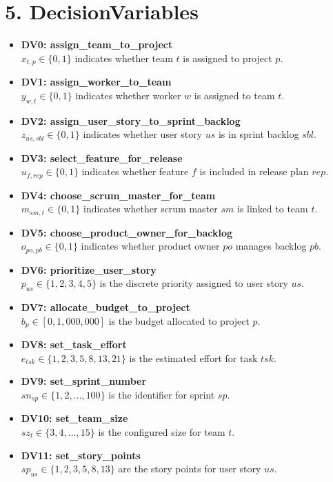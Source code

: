 \documentclass[11pt,a4paper]{article}
\begin{document}
\section{5. DecisionVariables}
\begin{itemize}[leftmargin=2em]
  \item \textbf{DV0: assign\_team\_to\_project} \\
  $x_{t,p}\in\{0,1\}$ indicates whether team $t$ is assigned to project $p$.
  
  \item \textbf{DV1: assign\_worker\_to\_team} \\
  $y_{w,t}\in\{0,1\}$ indicates whether worker $w$ is assigned to team $t$.

  \item \textbf{DV2: assign\_user\_story\_to\_sprint\_backlog} \\
  $z_{us,sbl}\in\{0,1\}$ indicates whether user story $us$ is in sprint backlog $sbl$.

  \item \textbf{DV3: select\_feature\_for\_release} \\
  $u_{f,rep}\in\{0,1\}$ indicates whether feature $f$ is included in release plan $rep$.

  \item \textbf{DV4: choose\_scrum\_master\_for\_team} \\
  $m_{sm,t}\in\{0,1\}$ indicates whether scrum master $sm$ is linked to team $t$.

  \item \textbf{DV5: choose\_product\_owner\_for\_backlog} \\
  $o_{po,pb}\in\{0,1\}$ indicates whether product owner $po$ manages backlog $pb$.

  \item \textbf{DV6: prioritize\_user\_story} \\
  $p_{us}\in\{1,2,3,4,5\}$ is the discrete priority assigned to user story $us$.

  \item \textbf{DV7: allocate\_budget\_to\_project} \\
  $b_p\in[0,1{,}000{,}000]$ is the budget allocated to project $p$.

  \item \textbf{DV8: set\_task\_effort} \\
  $e_{tsk}\in\{1,2,3,5,8,13,21\}$ is the estimated effort for task $tsk$.

  \item \textbf{DV9: set\_sprint\_number} \\
  $sn_{sp}\in\{1,2,\dots,100\}$ is the identifier for sprint $sp$.

  \item \textbf{DV10: set\_team\_size} \\
  $sz_t\in\{3,4,\dots,15\}$ is the configured size for team $t$.

  \item \textbf{DV11: set\_story\_points} \\
  $sp_{us}\in\{1,2,3,5,8,13\}$ are the story points for user story $us$.
\end{itemize}
\end{document}
